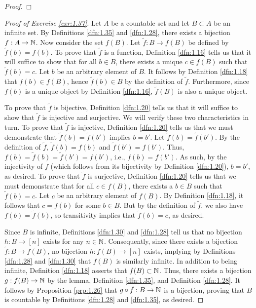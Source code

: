 \documentclass[../main.tex]{subfiles}
\begin{document}
\begin{exercise}
\begin{lemma*}
\begin{proof}
        \end{proof}
    \end{lemma*}
    \begin{proof}[Proof of Exercise \ref{exr:1.37}]
        Let $A$ be a countable set and let $B\subset A$ be an infinite set. By Definitions \ref{dfn:1.35} and \ref{dfn:1.28}, there exists a bijection $f:A\to\mathbb{N}$. Now consider the set $f(B)$. Let $\tilde{f}:B\to f(B)$ be defined by $\tilde{f}(b)=f(b)$. To prove that $\tilde{f}$ is a function, Definition \ref{dfn:1.16} tells us that it will suffice to show that for all $b\in B$, there exists a unique $c\in f(B)$ such that $\tilde{f}(b)=c$. Let $b$ be an arbitrary element of $B$. It follows by Definition \ref{dfn:1.18} that $f(b)\in f(B)$, hence $\tilde{f}(b)\in B$ by the definition of $\tilde{f}$. Furthermore, since $f(b)$ is a unique object by Definition \ref{dfn:1.16}, $\tilde{f}(B)$ is also a unique object.\par
        To prove that $\tilde{f}$ is bijective, Definition \ref{dfn:1.20} tells us that it will suffice to show that $\tilde{f}$ is injective and surjective. We will verify these two characteristics in turn. To prove that $\tilde{f}$ is injective, Definition \ref{dfn:1.20} tells us that we must demonstrate that $\tilde{f}(b)=\tilde{f}(b')$ implies $b=b'$. Let $\tilde{f}(b)=\tilde{f}(b')$. By the definition of $\tilde{f}$, $\tilde{f}(b)=f(b)$ and $\tilde{f}(b')=f(b')$. Thus, $f(b)=\tilde{f}(b)=\tilde{f}(b')=f(b')$, i.e., $f(b)=f(b')$. As such, by the injectivity of $f$ (which follows from its bijectivity by Definition \ref{dfn:1.20}), $b=b'$, as desired. To prove that $\tilde{f}$ is surjective, Definition \ref{dfn:1.20} tells us that we must demonstrate that for all $c\in f(B)$, there exists a $b\in B$ such that $\tilde{f}(b)=c$. Let $c$ be an arbitrary element of $f(B)$. By Definition \ref{dfn:1.18}, it follows that $c=f(b)$ for some $b\in B$. But by the definition of $\tilde{f}$, we also have $f(b)=\tilde{f}(b)$, so transitivity implies that $\tilde{f}(b)=c$, as desired.\par
        Since $B$ is infinite, Definitions \ref{dfn:1.30} and \ref{dfn:1.28} tell us that no bijection $h:B\to[n]$ exists for any $n\in\mathbb{N}$. Consequently, since there exists a bijection $\tilde{f}:B\to f(B)$, no bijection $h:f(B)\to[n]$ exists, implying by Definitions \ref{dfn:1.28} and \ref{dfn:1.30} that $f(B)$ is similarly infinite. In addition to being infinite, Definition \ref{dfn:1.18} asserts that $f(B)\subset\mathbb{N}$. Thus, there exists a bijection $g:f(B)\to\mathbb{N}$ by the lemma, Definition \ref{dfn:1.35}, and Definition \ref{dfn:1.28}. It follows by Proposition \ref{prp:1.26} that $g\circ\tilde{f}:B\to\mathbb{N}$ is a bijection, proving that $B$ is countable by Definitions \ref{dfn:1.28} and \ref{dfn:1.35}, as desired.
    \end{proof}
\end{exercise}
\end{document}
